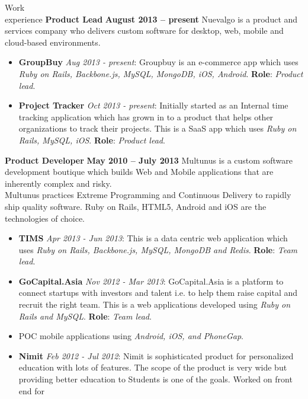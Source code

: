 \documentclass{resume}
\begin{document}
\begin{category}{Work \\experience}
  \citemnobullet \textbf{Product Lead} \hfill \textbf{August 2013 -- present}
  \citemnobullet Nuevalgo is a product and services company who delivers custom software for desktop, web, mobile and cloud-based environments.
  \begin{itemize}
  \item \textbf{GroupBuy} {\em Aug 2013 - present}: Groupbuy is an e-commerce app which uses {\em Ruby on Rails, Backbone.js, MySQL, MongoDB, iOS, Android}. \textbf{Role}: {\em Product lead}. 
  \item \textbf{Project Tracker} {\em Oct 2013 - present}: Initially started as an Internal time tracking application which has grown in to a product that helps other    organizations to track their projects. This is a SaaS app which uses {\em Ruby on Rails, MySQL, iOS}. \textbf{Role}: {\em Product lead}. 
  \end{itemize}
  \citemnobullet \textbf{Product Developer} \hfill \textbf{May 2010 -- July 2013}
  \citemnobullet Multunus is a custom software development boutique
  which builds Web and Mobile applications that are inherently
  complex and risky.\\Multunus practices Extreme Programming and Continuous
  Delivery to rapidly ship quality software. Ruby on Rails, HTML5, Android and iOS are the technologies of choice.
  \begin{itemize}
  \item \textbf{TIMS} {\em Apr 2013 - Jun 2013}: This is a data centric web application which uses {\em Ruby on Rails, Backbone.js, MySQL, MongoDB and Redis}. \textbf{Role}: {\em Team lead}. 
  \item \textbf{GoCapital.Asia} {\em Nov 2012 - Mar 2013}: GoCapital.Asia is a
    platform to connect startups with investors and talent i.e. to
    help them raise capital and recruit the right team. This is a web
    applications developed using {\em Ruby on Rails and MySQL}. \textbf{Role}:
    {\em Team lead}.
  \item POC mobile applications using {\em Android, iOS, and PhoneGap}.
  \item \textbf{Nimit} {\em Feb 2012 - Jul 2012}: Nimit is sophisticated
    product for personalized education with lots of features. The
    scope of the product is very wide but providing better education
    to Students is one of the goals. Worked on front end for

\end{itemize}
\end{category}
\end{document}
